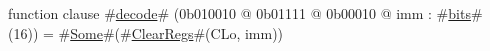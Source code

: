 function clause #\hyperref[zdecode]{decode}# (0b010010 @ 0b01111 @ 0b00010 @ imm : #\hyperref[zbits]{bits}#(16)) = #\hyperref[zSome]{Some}#(#\hyperref[zClearRegs]{ClearRegs}#(CLo,  imm))

